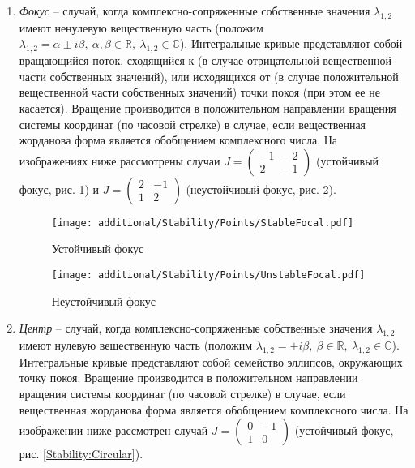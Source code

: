 \begin{enumerate}
		\item \textit{Фокус} -- случай, когда комплексно-сопряженные собственные значения $\lambda_{1, 2}$ имеют ненулевую вещественную часть (положим $\lambda_{1, 2} = \alpha \pm i \beta, ~ \alpha, \beta \in \mathbb{R}, ~ \lambda_{1, 2} \in \mathbb{C}$). Интегральные кривые представляют собой вращающийся поток, сходящийся к (в случае отрицательной вещественной части собственных значений), или исходящихся от (в случае положительной вещественной части собственных значений) точки покоя (при этом ее не касается). Вращение производится в положительном направлении вращения системы координат (по часовой стрелке) в случае, если вещественная жорданова форма является обобщением комплексного числа. На изображениях ниже рассмотрены случаи $J = \begin{pmatrix} -1 & -2 \\ 2 & -1 \end{pmatrix}$ (устойчивый фокус, рис. \ref{Stability:StableFocal}) и $J = \begin{pmatrix} 2 & -1 \\ 1 & 2 \end{pmatrix}$ (неустойчивый фокус, рис. \ref{Stability:UnstableFocal}).

			\begin{multicols}{2}

				\begin{figure}[H]
					\centering
					\texttt{[image: additional/Stability/Points/StableFocal.pdf]}
					\caption{Устойчивый фокус}
					\label{Stability:StableFocal}
				\end{figure}

			\columnbreak

				\begin{figure}[H]
					\centering
					\texttt{[image: additional/Stability/Points/UnstableFocal.pdf]}
					\caption{Неустойчивый фокус}
					\label{Stability:UnstableFocal}
				\end{figure}

			\end{multicols}

		\item \textit{Центр} -- случай, когда комплексно-сопряженные собственные значения $\lambda_{1, 2}$ имеют нулевую вещественную часть (положим $\lambda_{1, 2} = \pm i \beta, ~ \beta \in \mathbb{R}, ~ \lambda_{1, 2} \in \mathbb{C}$). Интегральные кривые представляют собой семейство эллипсов, окружающих точку покоя. Вращение производится в положительном направлении вращения системы координат (по часовой стрелке) в случае, если вещественная жорданова форма является обобщением комплексного числа. На изображении ниже рассмотрен случай $J = \begin{pmatrix} 0 & -1 \\ 1 & 0 \end{pmatrix}$ (устойчивый фокус, рис. \ref{Stability:Circular}). 


\end{enumerate}
